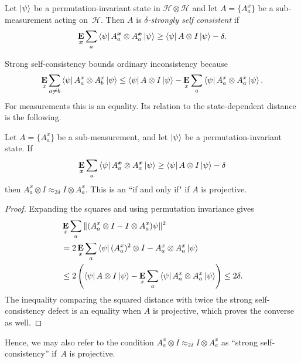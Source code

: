 \documentclass[11pt]{article}
\theoremstyle{definition}
\newcommand{\E}{\mathop{\bf E\/}}
\newcommand{\ot}{\otimes}
\newcommand{\calH}{\mathcal{H}}
\newcommand{\bx}{{\boldsymbol{x}}}
\begin{document}
\begin{definition}\label{def:strong-self-consistency}
Let $\ket{\psi}$ be a permutation-invariant state in $\calH \ot \calH$
and let $A = \{A^x_a\}$ be a sub-measurement acting on~$\calH$.
Then $A$ is \emph{$\delta$-strongly self consistent} if
\begin{equation*}
\E_{\bx} \sum_a \bra{\psi} A^{\bx}_a \otimes A^{\bx}_a \ket{\psi}
\geq
\bra{\psi} A \otimes I \ket{\psi} -  \delta.
\end{equation*}
\end{definition}

Strong self-consistency bounds ordinary inconsistency because
\[
 \E_x\sum_{a\ne b}\bra\psi A_a^x\otimes A_b^x\ket\psi
 \leq\bra\psi A\otimes I\ket\psi
       -\E_x\sum_a\bra\psi A_a^x\otimes A_a^x\ket\psi.
\]
For measurements this is an equality.  Its relation to the
state-dependent distance is the following.

\begin{proposition}\label{prop:two-notions-of-self-consistency}
Let $A=\{A_a^x\}$ be a sub-measurement, and let $\ket\psi$
be a permutation-invariant state. If
\begin{equation*}
\E_{\bx} \sum_a \bra{\psi} A^{\bx}_a \otimes A^{\bx}_a \ket{\psi} \geq \bra{\psi} A \otimes I \ket{\psi} - \delta
\end{equation*}
then $A^x_a \otimes I \approx_{2\delta} I \otimes A^x_a$.
This is an ``if and only if" if $A$ is projective.
\end{proposition}
\begin{proof}
Expanding the squares and using permutation invariance gives
\begin{align}
 &\E_x\sum_a\|(A_a^x\otimes I-I\otimes A_a^x)\psi\|^2\nonumber\\
 &=2\E_x\sum_a\bra\psi
       (A_a^x)^2\otimes I-A_a^x\otimes A_a^x\ket\psi\nonumber\\
 &\leq2\left(\bra\psi A\otimes I\ket\psi
       -\E_x\sum_a\bra\psi A_a^x\otimes A_a^x\ket\psi\right)
 \leq2\delta.\label{eq:self-consistency-projective-step}
\end{align}
The inequality comparing the squared distance with twice the
strong self-consistency defect is an equality when $A$ is projective,
which proves the converse as well.
\end{proof}

Hence, we may also refer to the condition $A^x_a \ot I \approx_{2\delta} I \ot A^x_a$
as ``strong self-consistency'' if~$A$ is projective.
\end{document}
